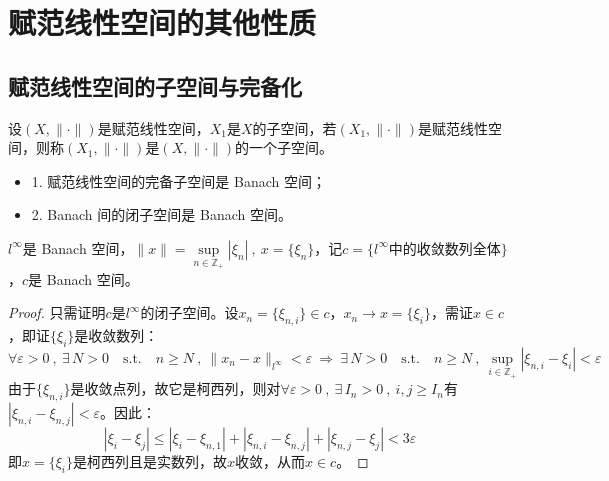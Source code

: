 \newpage
\section{赋范线性空间的其他性质}
\subsection{赋范线性空间的子空间与完备化}
\begin{definition}[赋范线性空间的子空间]
设$(X,\|\cdot\|)$是赋范线性空间，$X_1$是$X$的子空间，若$(X_1,\|\cdot\|)$是赋范线性空间，则称$(X_1,\|\cdot\|)$是$(X,\|\cdot\|)$的一个子空间。
\end{definition}
\begin{theorem}\label{theorem:zkj}
\begin{itemize}
    \item 1. 赋范线性空间的完备子空间是 Banach 空间；
    \item 2. Banach 间的闭子空间是 Banach 空间。
\end{itemize}
\end{theorem}
\begin{example}
\quad $l^{\infty}$是 Banach 空间，$\|x\|=\mathop \text{sup}\limits_{n \in \mathbb{Z}_+}|\xi_n| \ , \ x=\{\xi_n\}$，记$c=\{l^{\infty}\text{中的收敛数列全体}\}$，$c$是 Banach 空间。
\end{example}
\begin{proof}
只需证明$c$是$l^{\infty}$的闭子空间。设$x_n=\{\xi_{n,i}\} \in c$，$x_n \to x=\{\xi_i\}$，需证$x \in c$，即证$\{\xi_i\}$是收敛数列：
\[\forall \varepsilon>0 \ , \ \exists \, N>0 \quad \text{s.t.} \quad n \geq N \ , \ \|x_n-x\|_{l^{\infty}}<\varepsilon \ \Rightarrow \ \exists \, N>0 \quad \text{s.t.} \quad n \geq N \ , \ \mathop \text{sup}\limits_{i \in \mathbb{Z}_+}|\xi_{n,i}-\xi_i|<\varepsilon\]
由于$\{\xi_{n,i}\}$是收敛点列，故它是柯西列，则对$\forall \varepsilon>0 \ , \ \exists \, I_n>0 \ , \ i,j \geq I_n$有$|\xi_{n,i}-\xi_{n,j}|<\varepsilon$。因此：
\[|\xi_{i}-\xi_{j}| \leq |\xi_{i}-\xi_{n,1}|+|\xi_{n,i}-\xi_{n,j}|+|\xi_{n,j}-\xi_{j}|<3\varepsilon\]
即$x=\{\xi_i\}$是柯西列且是实数列，故$x$收敛，从而$x \in c$。
\end{proof}

